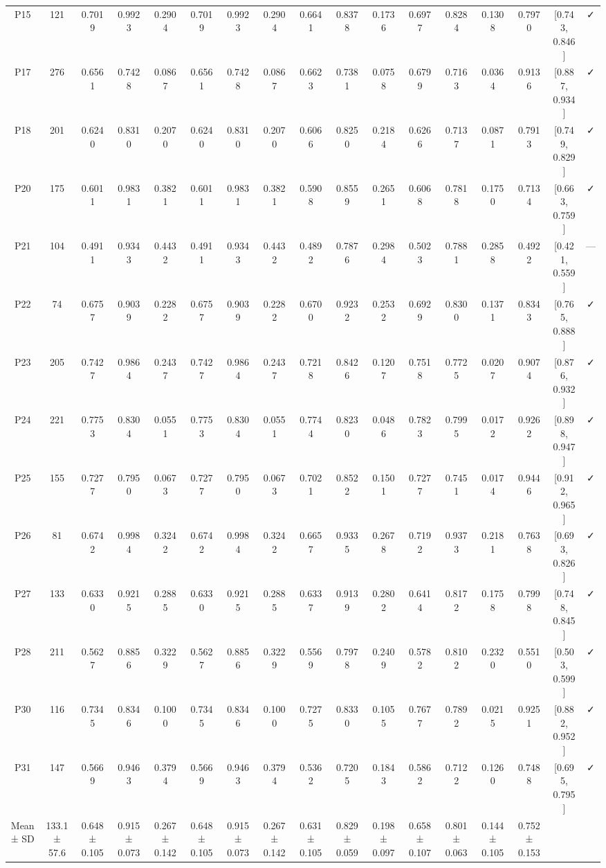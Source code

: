\begin{table}[hptb]
\begin{table}
\begin{tabular}{ccccccccccccccccc}
P15 & 121 & 0.7019 & 0.9923 & 0.2904 & 0.7019 & 0.9923 & 0.2904 & 0.6641 & 0.8378 & 0.1736 & 0.6977 & 0.8284 & 0.1308 & 0.7970 & [0.743, 0.846] & ✓ \\
P17 & 276 & 0.6561 & 0.7428 & 0.0867 & 0.6561 & 0.7428 & 0.0867 & 0.6623 & 0.7381 & 0.0758 & 0.6799 & 0.7163 & 0.0364 & 0.9136 & [0.887, 0.934] & ✓ \\
P18 & 201 & 0.6240 & 0.8310 & 0.2070 & 0.6240 & 0.8310 & 0.2070 & 0.6066 & 0.8250 & 0.2184 & 0.6266 & 0.7137 & 0.0871 & 0.7913 & [0.749, 0.829] & ✓ \\
P20 & 175 & 0.6011 & 0.9831 & 0.3821 & 0.6011 & 0.9831 & 0.3821 & 0.5908 & 0.8559 & 0.2651 & 0.6068 & 0.7818 & 0.1750 & 0.7134 & [0.663, 0.759] & ✓ \\
P21 & 104 & 0.4911 & 0.9343 & 0.4432 & 0.4911 & 0.9343 & 0.4432 & 0.4892 & 0.7876 & 0.2984 & 0.5023 & 0.7881 & 0.2858 & 0.4922 & [0.421, 0.559] & — \\
P22 & 74 & 0.6757 & 0.9039 & 0.2282 & 0.6757 & 0.9039 & 0.2282 & 0.6700 & 0.9232 & 0.2532 & 0.6929 & 0.8300 & 0.1371 & 0.8343 & [0.765, 0.888] & ✓ \\
P23 & 205 & 0.7427 & 0.9864 & 0.2437 & 0.7427 & 0.9864 & 0.2437 & 0.7218 & 0.8426 & 0.1207 & 0.7518 & 0.7725 & 0.0207 & 0.9074 & [0.876, 0.932] & ✓ \\
P24 & 221 & 0.7753 & 0.8304 & 0.0551 & 0.7753 & 0.8304 & 0.0551 & 0.7744 & 0.8230 & 0.0486 & 0.7823 & 0.7995 & 0.0172 & 0.9262 & [0.898, 0.947] & ✓ \\
P25 & 155 & 0.7277 & 0.7950 & 0.0673 & 0.7277 & 0.7950 & 0.0673 & 0.7021 & 0.8522 & 0.1501 & 0.7277 & 0.7451 & 0.0174 & 0.9446 & [0.912, 0.965] & ✓ \\
P26 & 81 & 0.6742 & 0.9984 & 0.3242 & 0.6742 & 0.9984 & 0.3242 & 0.6657 & 0.9335 & 0.2678 & 0.7192 & 0.9373 & 0.2181 & 0.7638 & [0.693, 0.826] & ✓ \\
P27 & 133 & 0.6330 & 0.9215 & 0.2885 & 0.6330 & 0.9215 & 0.2885 & 0.6337 & 0.9139 & 0.2802 & 0.6414 & 0.8172 & 0.1758 & 0.7998 & [0.748, 0.845] & ✓ \\
P28 & 211 & 0.5627 & 0.8856 & 0.3229 & 0.5627 & 0.8856 & 0.3229 & 0.5569 & 0.7978 & 0.2409 & 0.5782 & 0.8102 & 0.2320 & 0.5510 & [0.503, 0.599] & ✓ \\
P30 & 116 & 0.7345 & 0.8346 & 0.1000 & 0.7345 & 0.8346 & 0.1000 & 0.7275 & 0.8330 & 0.1055 & 0.7677 & 0.7892 & 0.0215 & 0.9251 & [0.882, 0.952] & ✓ \\
P31 & 147 & 0.5669 & 0.9463 & 0.3794 & 0.5669 & 0.9463 & 0.3794 & 0.5362 & 0.7205 & 0.1843 & 0.5862 & 0.7122 & 0.1260 & 0.7488 & [0.695, 0.795] & ✓ \\
Mean ± SD & 133.1 ± 57.6 & 0.648 ± 0.105 & 0.915 ± 0.073 & 0.267 ± 0.142 & 0.648 ± 0.105 & 0.915 ± 0.073 & 0.267 ± 0.142 & 0.631 ± 0.105 & 0.829 ± 0.059 & 0.198 ± 0.097 & 0.658 ± 0.107 & 0.801 ± 0.063 & 0.144 ± 0.105 & 0.752 ± 0.153 &  &  \\
\bottomrule
\end{tabular}
\end{table}
\end{table}
